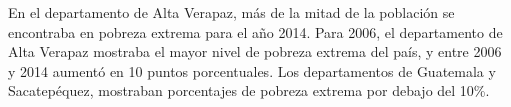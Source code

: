 En el departamento de Alta Verapaz, más de la mitad de la población se encontraba en pobreza extrema para el año 2014. Para 2006, el departamento de Alta Verapaz mostraba el mayor nivel de pobreza extrema del país, y entre 2006 y 2014 aumentó en 10 puntos porcentuales.  Los departamentos de Guatemala y Sacatepéquez, mostraban porcentajes de pobreza extrema por debajo del 10\%.
